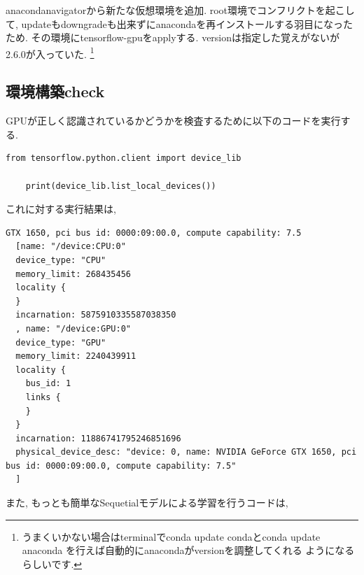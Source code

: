 \documentclass[a4paper,11pt]{jsarticle}
\begin{document}
anacondanavigatorから新たな仮想環境を追加. root環境でコンフリクトを起こして,
updateもdowngradeも出来ずにanacondaを再インストールする羽目になったため.
その環境にtensorflow-gpuをapplyする. versionは指定した覚えがないが2.6.0が入っていた.
\footnote{うまくいかない場合はterminalでconda update condaとconda update anaconda を行えば自動的にanacondaがversionを調整してくれる
  ようになるらしいです.}

\subsection{環境構築check}
GPUが正しく認識されているかどうかを検査するために以下のコードを実行する.

\begin{lstlisting}[caption=check]
  from tensorflow.python.client import device_lib

    print(device_lib.list_local_devices()) 
\end{lstlisting}
これに対する実行結果は,
\begin{lstlisting}[caption=result\_check]
  GTX 1650, pci bus id: 0000:09:00.0, compute capability: 7.5
  [name: "/device:CPU:0"
  device_type: "CPU"
  memory_limit: 268435456
  locality {
  }
  incarnation: 5875910335587038350
  , name: "/device:GPU:0"
  device_type: "GPU"
  memory_limit: 2240439911
  locality {
    bus_id: 1
    links {
    }
  }
  incarnation: 11886741795246851696
  physical_device_desc: "device: 0, name: NVIDIA GeForce GTX 1650, pci bus id: 0000:09:00.0, compute capability: 7.5"
  ]
\end{lstlisting}

また, もっとも簡単なSequetialモデルによる学習を行うコードは,
\end{document}
